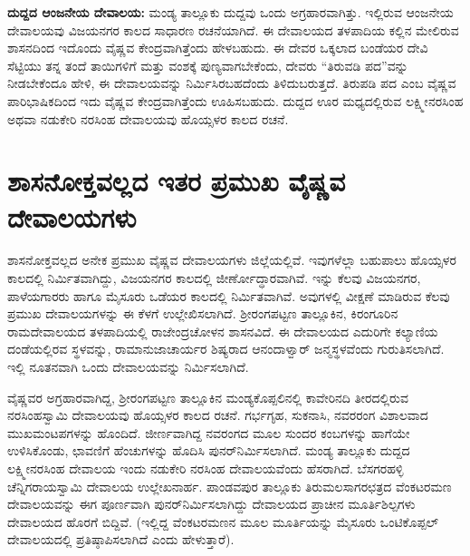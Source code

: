 \textbf{ದುದ್ದದ ಆಂಜನೇಯ ದೇವಾಲಯ:} ಮಂಡ್ಯ ತಾಲ್ಲೂಕು ದುದ್ದವು ಒಂದು ಅಗ್ರಹಾರವಾಗಿತ್ತು. ಇಲ್ಲಿರುವ ಆಂಜನೇಯ ದೇವಾಲಯವು ವಿಜಯನಗರ ಕಾಲದ ಸಾಧಾರಣ ರಚನೆಯಾಗಿದೆ. ಈ ದೇವಾಲಯದ ತಳಪಾದಿಯ ಕಲ್ಲಿನ ಮೇಲಿರುವ ಶಾಸನದಿಂದ ಇದೊಂದು ವೈಷ್ಣವ ಕೇಂದ್ರವಾಗಿತ್ತೆಂದು ಹೇಳಬಹುದು. ಈ ದೇವರ ಒಕ್ಕಲಾದ ಬಂಡೆಯರ ದೇವಿ ಸೆಟ್ಟಿಯು ತನ್ನ ತಂದೆ ತಾಯಿಗಳಿಗೆ ಮತ್ತು ವಂಶಕ್ಕೆ ಪುಣ್ಯವಾಗಬೇಕೆಂದು, ದೇವರು “ತಿರುವಡಿ ಪದ”ವನ್ನು ನೀಡಬೇಕೆಂದೂ ಹೇಳಿ, ಈ ದೇವಾಲಯವನ್ನು ನಿರ್ಮಿಸಿರಬಹದೆಂದು ತಿಳಿದುಬರುತ್ತದೆ. ತಿರುಪಡಿ ಪದ ಎಂಬ ವೈಷ್ಣವ ಪಾರಿಭಾಷಿಕದಿಂದ ಇದು ವೈಷ್ಣವ ಕೇಂದ್ರವಾಗಿತ್ತೆಂದು ಊಹಿಸಬಹುದು. ದುದ್ದದ ಊರ ಮಧ್ಯದಲ್ಲಿರುವ ಲಕ್ಷ್ಮೀನರಸಿಂಹ ಅಥವಾ ನಡುಕೇರಿ ನರಸಿಂಹ ದೇವಾಲಯವು ಹೊಯ್ಸಳರ ಕಾಲದ ರಚನೆ.


\section*{ಶಾಸನೋಕ್ತವಲ್ಲದ ಇತರ ಪ್ರಮುಖ ವೈಷ್ಣವ ದೇವಾಲಯಗಳು}

ಶಾಸನೋಕ್ತವಲ್ಲದ ಅನೇಕ ಪ್ರಮುಖ ವೈಷ್ಣವ ದೇವಾಲಯಗಳು ಜಿಲ್ಲೆಯಲ್ಲಿವೆ. ಇವುಗಳೆಲ್ಲಾ ಬಹುಪಾಲು ಹೊಯ್ಸಳರ ಕಾಲದಲ್ಲಿ ನಿರ್ಮಿತವಾಗಿದ್ದು, ವಿಜಯನಗರ ಕಾಲದಲ್ಲಿ ಜೀರ್ಣೋದ್ಧಾರವಾಗಿವೆ. ಇನ್ನು ಕೆಲವು ವಿಜಯನಗರ, ಪಾಳೆಯಗಾರರು ಹಾಗೂ ಮೈಸೂರು ಒಡೆಯರ ಕಾಲದಲ್ಲಿ ನಿರ್ಮಿತವಾಗಿವೆ. ಅವುಗಳಲ್ಲಿ ವೀಕ್ಷಣೆ ಮಾಡಿರುವ ಕೆಲವು ಪ್ರಮುಖ ದೇವಾಲಯಗಳನ್ನು ಈ ಕೆಳಗೆ ಉಲ್ಲೇಖಿಸಲಾಗಿದೆ. ಶ‍್ರೀರಂಗಪಟ್ಟಣ ತಾಲ್ಲೂಕಿನ, ಕಿರಂಗೂರಿನ ರಾಮದೇವಾಲಯದ ತಳಪಾದಿಯಲ್ಲಿ ರಾಜೇಂದ್ರಚೋಳನ ಶಾಸನವಿದೆ. ಈ ದೇವಾಲಯದ ಎದುರಿಗೇ ಕಲ್ಯಾಣಿಯ ದಂಡೆಯಲ್ಲಿರವ ಸ್ಥಳವನ್ನು, ರಾಮಾನುಜಾಚಾರ್ಯರ ಶಿಷ್ಯರಾದ ಆನಂದಾಳ್ವಾರ್​ ಜನ್ಮಸ್ಥಳವೆಂದು ಗುರುತಿಸಲಾಗಿದೆ. ಇಲ್ಲಿ ನೂತನವಾಗಿ ಒಂದು ದೇವಾಲಯವನ್ನು ನಿರ್ಮಿಸಲಾಗಿದೆ.

ವೈಷ್ಣವರ ಅಗ್ರಹಾರವಾಗಿದ್ದ, ಶ‍್ರೀರಂಗಪಟ್ಟಣ ತಾಲ್ಲೂಕಿನ ಮಂಡ್ಯಕೊಪ್ಪಲಿನಲ್ಲಿ ಕಾವೇರಿನದಿ ತೀರದಲ್ಲಿರುವ ನರಸಿಂಹಸ್ವಾಮಿ ದೇವಾಲಯವು ಹೊಯ್ಸಳರ ಕಾಲದ ರಚನೆ. ಗರ್ಭಗೃಹ, ಸುಕನಾಸಿ, ನವರರಂಗ ವಿಶಾಲವಾದ ಮುಖಮಂಟಪಗಳನ್ನು ಹೊಂದಿದೆ. ಜೀರ್ಣವಾಗಿದ್ದ ನವರಂಗದ ಮೂಲ ಸುಂದರ ಕಂಬಗಳನ್ನು ಹಾಗೆಯೇ ಉಳಿಸಿಕೊಂಡು, ಛಾವಣಿಗೆ ಹೆಂಚುಗಳನ್ನು ಹೊದಿಸಿ ಪುನರ್​ನಿರ್ಮಿಸಲಾಗಿದೆ. ಮಂಡ್ಯ ತಾಲ್ಲೂಕು ದುದ್ದದ ಲಕ್ಷ್ಮೀನರಸಿಂಹ ದೇವಾಲಯ ಇಂದು ನಡುಕೇರಿ ನರಸಿಂಹ ದೇವಾಲಯವೆಂದು ಹೆಸರಾಗಿದೆ. ಬೆಸಗರಹಳ್ಳಿ ಚೆನ್ನಿಗರಾಯಸ್ವಾಮಿ ದೇವಾಲಯ ಉಲ್ಲೇಖನಾರ್ಹ. ಪಾಂಡವಪುರ ತಾಲ್ಲೂಕು ತಿರುಮಲಸಾಗರಛತ್ರದ ವೆಂಕಟರಮಣ ದೇವಾಲಯವನ್ನು ಈಗ ಪೂರ್ಣವಾಗಿ ಪುನರ್​ನಿರ್ಮಿಸ\-ಲಾಗಿದ್ದು ದೇವಾಲಯದ ಪ್ರಾಚೀನ ಮೂರ್ತಿಶಿಲ್ಪಗಳು ದೇವಾಲಯದ ಹೊರಗೆ ಬಿದ್ದಿವೆ. (ಇಲ್ಲಿದ್ದ ವೆಂಕಟರಮಣನ ಮೂಲ ಮೂರ್ತಿಯನ್ನು ಮೈಸೂರು ಒಂಟಿಕೊಪ್ಪಲ್​ ದೇವಾಲಯದಲ್ಲಿ ಪ್ರತಿಷ್ಠಾಪಿಸಲಾಗಿದೆ ಎಂದು ಹೇಳುತ್ತಾರೆ).


